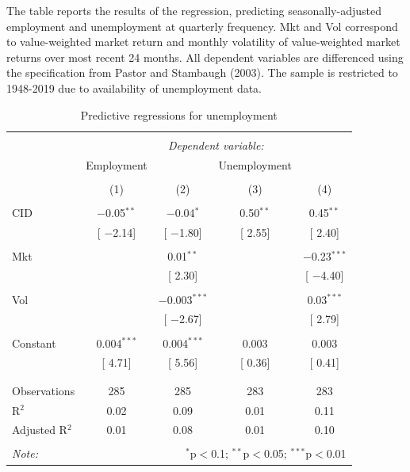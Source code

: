 \documentclass[12pt]{article}
\begin{document}
\begin{table}[!htbp] \centering 
  \caption{Predictive regressions for unemployment} 
  \label{} 
      \begin{flushleft}
    {\medskip\small
 The table reports the results of the regression, predicting seasonally-adjusted employment and unemployment at quarterly frequency. Mkt and Vol correspond to value-weighted market return and monthly volatility of value-weighted market returns over most recent 24 months. All dependent variables are differenced using the specification from Pastor and Stambaugh (2003). The sample is restricted to 1948-2019 due to availability of unemployment data.}
    \medskip
    \end{flushleft}
\begin{tabular}{@{\extracolsep{5pt}}lcccc} 
\\[-1.8ex]\hline 
\hline \\[-1.8ex] 
 & \multicolumn{4}{c}{\textit{Dependent variable:}} \\ 
\cline{2-5} 
 & Employment &  & Unemployment &  \\ 
\\[-1.8ex] & (1) & (2) & (3) & (4)\\ 
\hline \\[-1.8ex] 
 CID & $-$0.05$^{**}$ & $-$0.04$^{*}$ & 0.50$^{**}$ & 0.45$^{**}$ \\ 
  & [ $-$2.14] & [ $-$1.80] & [ 2.55] & [ 2.40] \\ 
  & & & & \\ 
 Mkt &  & 0.01$^{**}$ &  & $-$0.23$^{***}$ \\ 
  &  & [ 2.30] &  & [ $-$4.40] \\ 
  & & & & \\ 
 Vol &  & $-$0.003$^{***}$ &  & 0.03$^{***}$ \\ 
  &  & [ $-$2.67] &  & [ 2.79] \\ 
  & & & & \\ 
 Constant & 0.004$^{***}$ & 0.004$^{***}$ & 0.003 & 0.003 \\ 
  & [ 4.71] & [ 5.56] & [ 0.36] & [ 0.41] \\ 
  & & & & \\ 
\hline \\[-1.8ex] 
Observations & 285 & 285 & 283 & 283 \\ 
R$^{2}$ & 0.02 & 0.09 & 0.01 & 0.11 \\ 
Adjusted R$^{2}$ & 0.01 & 0.08 & 0.01 & 0.10 \\ 
\hline 
\hline \\[-1.8ex] 
\textit{Note:}  & \multicolumn{4}{r}{$^{*}$p$<$0.1; $^{**}$p$<$0.05; $^{***}$p$<$0.01} \\ 
\end{tabular} 
\end{table}
\end{document}
